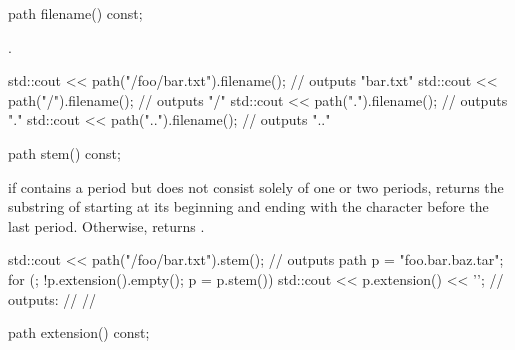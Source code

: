 %
\begin{itemdecl}
path filename() const;
\end{itemdecl}

\begin{itemdescr}
\pnum
\returns {}.

\pnum
\begin{example}
\begin{codeblock}
std::cout << path("/foo/bar.txt").filename(); // outputs "bar.txt"
std::cout << path("/").filename();            // outputs "/"
std::cout << path(".").filename();            // outputs "."
std::cout << path("..").filename();           // outputs ".."
\end{codeblock}
\end{example}
\end{itemdescr}

%
\begin{itemdecl}
path stem() const;
\end{itemdecl}

\begin{itemdescr}
\pnum
\returns if  contains a period but does not
  consist solely of one or two periods, returns
  the substring of  starting at its beginning and
  ending with the character before the last period. Otherwise,
  returns .

\pnum
\begin{example}
\begin{codeblock}
std::cout << path("/foo/bar.txt").stem(); // outputs 
path p = "foo.bar.baz.tar";
for (; !p.extension().empty(); p = p.stem())
  std::cout << p.extension() << '\n';
  // outputs: 
  //          
  //          
\end{codeblock}
\end{example}
\end{itemdescr}

%
\begin{itemdecl}
path extension() const;
\end{itemdecl}

